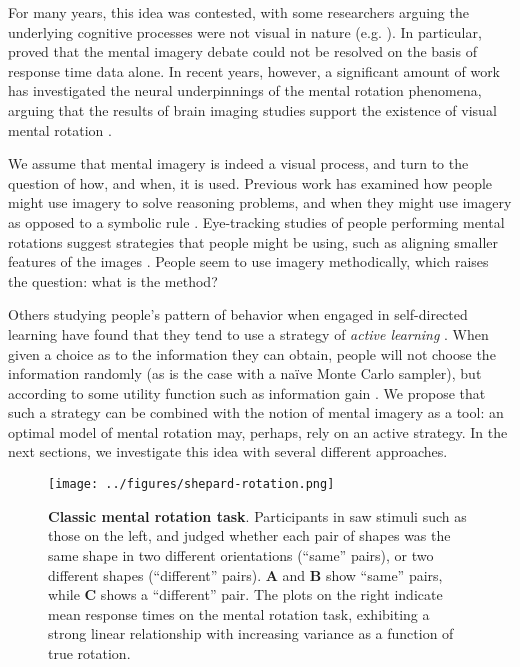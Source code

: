 \documentclass{article} %
\newcommand{\naive}[0]{na\"ive}
\begin{document}
For many years, this idea was contested, with some researchers arguing
the underlying cognitive processes were not visual in nature
(e.g. \cite{Pylyshyn1981}). In particular, \cite{Anderson1978} proved
that the mental imagery debate could not be resolved on the basis of
response time data alone. In recent years, however, a significant
amount of work has investigated the neural underpinnings of the mental
rotation phenomena, arguing that the results of brain imaging studies
support the existence of visual mental rotation \cite{Kosslyn1988,
  Kosslyn:2009tj}.

We assume that mental imagery is indeed a visual process, and turn to
the question of how, and when, it is used. Previous work has examined
how people might use imagery \cite{Hegarty2004, Schwartz1999} to solve
reasoning problems, and when they might use imagery as opposed to a
symbolic rule \cite{Schwartz:1996uy}. Eye-tracking studies of people
performing mental rotations suggest strategies that people might be
using, such as aligning smaller features of the images
\cite{Just1976}. People seem to use imagery methodically, which raises
the question: what is the method?

Others studying people's pattern of behavior when engaged in
self-directed learning have found that they tend to use a strategy of
\textit{active learning} \cite{Gureckis:2012gu, Markant:2012uu}. When
given a choice as to the information they can obtain, people will not
choose the information randomly (as is the case with a \naive{} Monte
Carlo sampler), but according to some utility function such as
information gain \cite{Nelson2007, Markant:2012uu}. We propose that
such a strategy can be combined with the notion of mental imagery as a
tool: an optimal model of mental rotation may, perhaps, rely on an
active strategy. In the next sections, we investigate this idea with
several different approaches.

\begin{figure}[t]
  \centering
  \texttt{[image: ../figures/shepard-rotation.png]}
  \caption{\textbf{Classic mental rotation task}. Participants in
    \cite{Shepard1971} saw stimuli such as those on the left, and
    judged whether each pair of shapes was the same shape in two
    different orientations (``same'' pairs), or two different shapes
    (``different'' pairs). \textbf{A} and \textbf{B} show ``same''
    pairs, while \textbf{C} shows a ``different'' pair. The plots on
    the right indicate mean response times on the mental rotation
    task, exhibiting a strong linear relationship with increasing
    variance as a function of true rotation.}
  \label{fig:mental-rotation}
\end{figure}
\end{document}
